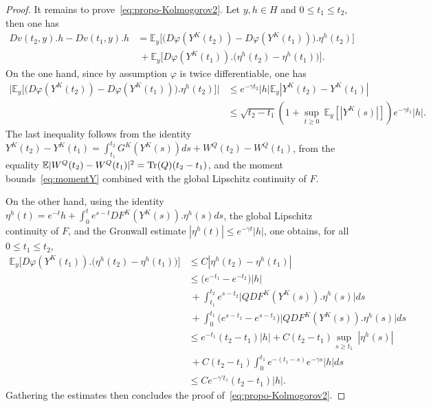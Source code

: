 \documentclass[11pt]{amsart}
\newcommand{\E}{\mathbb{E}}
\begin{document}
\begin{proof}
It remains to prove~\eqref{eq:propo-Kolmogorov2}. Let $y,h\in H$ and $0\le t_1\le t_2$, then one has
\begin{align*}
Dv(t_2,y).h-Dv(t_1,y).h&=\E_y\bigl[\bigl(D\varphi(Y^K(t_2))-D\varphi(Y^K(t_1))\bigr).\eta^h(t_2)\bigr]\\
&~+\E_y\bigl[D\varphi(Y^K(t_1)).\bigl(\eta^h(t_2)-\eta^h(t_1)\bigr)\bigr].
\end{align*}
On the one hand, since by assumption $\varphi$ is twice differentiable, one has
\begin{align*}
\big|\E_y\bigl[\bigl(D\varphi(Y^K(t_2))-D\varphi(Y^K(t_1))\bigr).\eta^h(t_2)\bigr]\big|&\le e^{-\gamma t_2}|h|\E_y|Y^K(t_2)-Y^K(t_1)|\\
&\le \sqrt{t_2-t_1}(1+\underset{t\ge 0}\sup~\E_y[|Y^K(s)|])e^{-\gamma t_1}|h|.
\end{align*}
The last inequality follows from the identity $Y^K(t_2)-Y^K(t_1)=\int_{t_1}^{t_2}G^K(Y^K(s))ds+W^Q(t_2)-W^Q(t_1)$, from the equality $\E|W^Q(t_2)-W^Q(t_1)|^2={\rm Tr}(Q)(t_2-t_1)$, and the moment bounds~\eqref{eq:momentY} combined with the global Lipschitz continuity of $F$.

On the other hand, using the identity $\eta^h(t)=e^{-t}h+\int_0^te^{s-t}DF^K(Y^K(s)).\eta^h(s)ds$, the global Lipschitz continuity of $F$, and the Gronwall estimate $|\eta^h(t)|\le e^{-\gamma t}|h|$, one obtains, for all $0\le t_1\le t_2$,
\begin{align*}
\E_y\bigl[D\varphi(Y^K(t_1)).\bigl(\eta^h(t_2)-\eta^h(t_1)\bigr)\bigr]&\le C|\eta^h(t_2)-\eta^h(t_1)|\\
&\le\bigl(e^{-t_1}-e^{-t_2}\bigr)|h|\\
&~+\int_{t_1}^{t_2}e^{s-t_2}\big|QDF^K(Y^K(s)).\eta^h(s)\big|ds\\
&~+\int_{0}^{t_1}\bigl(e^{s-t_1}-e^{s-t_2}\bigr)\big|QDF^K(Y^K(s)).\eta^h(s)\big|ds\\
&\le e^{-t_1}(t_2-t_1)|h|+C(t_2-t_1)\underset{s\ge t_1}\sup~|\eta^h(s)|\\
&~+C(t_2-t_1)\int_{0}^{t_1}e^{-(t_1-s)}e^{-\gamma s}|h|ds\\
&\le C e^{-\gamma' t_1}(t_2-t_1)|h|.
\end{align*}
Gathering the estimates then concludes the proof of~\eqref{eq:propo-Kolmogorov2}.
\end{proof}
\end{document}
